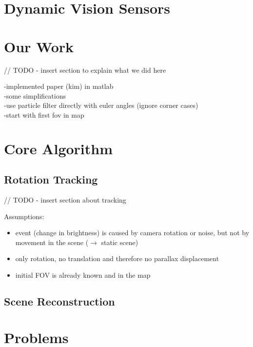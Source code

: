 \documentclass[10pt,twocolumn,letterpaper]{article}
\begin{document}
\section{Dynamic Vision Sensors}



\section{Our Work}

// TODO - insert section to explain what we did here

-implemented paper (kim) in matlab\\
-some simplifications\\
	-use particle filter directly with euler angles (ignore corner cases)\\
	-start with first fov in map\\
	
\section{Core Algorithm}



\subsection{Rotation Tracking}

// TODO - insert section about tracking

Assumptions:
\begin{itemize}
\item event (change in brightness) is caused by camera rotation or noise, but not by movement in the scene ($\rightarrow$ static scene)
\item only rotation, no translation and therefore no parallax displacement
\item initial FOV is already known and in the map
\end{itemize}

\subsection{Scene Reconstruction}



\section{Problems}
\end{document}
